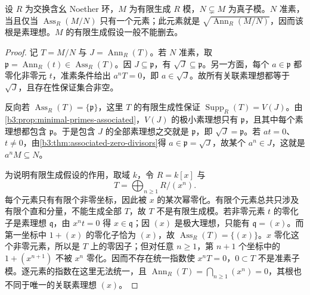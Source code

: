 \begin{proposition}\label{b3:prop:primary-submodule-associated}
	设 \(R\) 为交换含幺 Noether 环，\(M\) 为有限生成 \(R\) 模，\(N\subsetneq M\) 为真子模。\(N\) 准素，当且仅当 \(\operatorname{Ass}_R(M/N)\) 只有一个元素；此元素就是 \(\sqrt{\operatorname{Ann}_R(M/N)}\)，因而该根是素理想。\(M\) 的有限生成假设一般不能删去。
\end{proposition}
\begin{proof}
	记 \(T=M/N\) 与 \(J=\operatorname{Ann}_R(T)\)。若 \(N\) 准素，取 \(\mathfrak p=\operatorname{Ann}_R(t)\in\operatorname{Ass}_R(T)\)。因 \(J\subseteq\mathfrak p\)，有 \(\sqrt J\subseteq\mathfrak p\)。另一方面，每个 \(a\in\mathfrak p\) 都零化非零元 \(t\)，准素条件给出 \(a^nT=0\)，即 \(a\in\sqrt J\)。故所有关联素理想都等于 \(\sqrt J\)，且存在性保证集合非空。

	反向若 \(\operatorname{Ass}_R(T)=\{\mathfrak p\}\)，这里 \(T\) 的有限生成性保证 \(\operatorname{Supp}_R(T)=V(J)\)。由\cref{b3:prop:minimal-primes-associated}，\(V(J)\) 的极小素理想只有 \(\mathfrak p\)，且其中每个素理想都包含 \(\mathfrak p\)。于是包含 \(J\) 的全部素理想之交就是 \(\mathfrak p\)，即 \(\sqrt J=\mathfrak p\)。若 \(at=0\)、\(t\ne0\)，由\cref{b3:thm:associated-zero-divisors}得 \(a\in\mathfrak p=\sqrt J\)，故某个 \(a^n\in J\)，这就是 \(a^nM\subseteq N\)。

	为说明有限生成假设的作用，取域 \(k\)，令 \(R=k[x]\) 与
	\[
		T=\bigoplus_{n\ge1}R/(x^n).
	\]
	每个元素只有有限个非零坐标，因此被 \(x\) 的某次幂零化。有限个元素总共只涉及有限个直和分量，不能生成全部 \(T\)，故 \(T\) 不是有限生成模。若非零元素 \(t\) 的零化子是素理想 \(\mathfrak q\)，由 \(x^nt=0\) 得 \(x\in\mathfrak q\)；因 \((x)\) 是极大理想，只能有 \(\mathfrak q=(x)\)。而第一坐标中 \(1+(x)\) 的零化子恰为 \((x)\)，故 \(\operatorname{Ass}_R(T)=\{(x)\}\)。\(x\) 零化这个非零元素，所以是 \(T\) 上的零因子；但对任意 \(n\ge1\)，第 \(n+1\) 个坐标中的 \(1+(x^{n+1})\) 不被 \(x^n\) 零化。因而不存在统一指数使 \(x^nT=0\)，\(0\subset T\) 不是准素子模。逐元素的指数在这里无法统一，且 \(\operatorname{Ann}_R(T)=\bigcap_{n\ge1}(x^n)=0\)，其根也不同于唯一的关联素理想 \((x)\)。
\end{proof}

